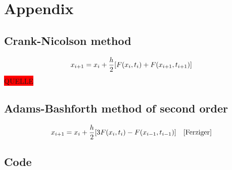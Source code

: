 \documentclass[12pt,a4paper,titlepage,headinclude,bibtotoc]{scrartcl}
\begin{document}
\section{Appendix}


\subsection{Crank-Nicolson method}
\label{CN}
\begin{equation}
    x_{i+1} = x_i + \frac{h}{2}\qty[ F\qty(x_i,t_i) + F\qty(x_{i+1},t_{i+1})] 
\end{equation}
\colorbox{red}{QUELLE}
\subsection{Adams-Bashforth method of second order}
\label{AD}
\begin{equation}
        x_{i+1} = x_i + \frac{h}{2}\qty[3F\qty(x_i,t_i) - F\qty(x_{i-1},t_{i-1})] \quad\cite[p.~131]{Ferziger}
\end{equation}

\subsection{Code}

{}

\end{document}
